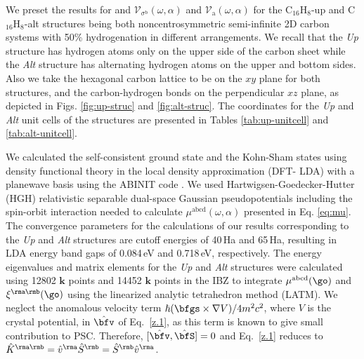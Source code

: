 \documentclass[prb,11pt,tightenlines,twocolumn,aps]{revtex4-1}
\begin{document}
We preset the results for 
and
$\mathcal{V}_{\sigma^{\mathrm{b}}}(\omega,\alpha)$ 
and
$\mathcal{V}_{\mathrm{a}}(\omega,\alpha)$ 
for the
C$_{16}$H$_{8}$-up  and C$_{16}$H$_{8}$-alt 
structures being both
noncentrosymmetric semi-infinite 2D carbon systems with 50\% hydrogenation in
different arrangements. We recall that the \emph{Up} structure has hydrogen
atoms only on the upper side of the carbon sheet while the \emph{Alt} structure
has alternating hydrogen atoms on the upper and bottom sides. Also we take the
hexagonal carbon lattice to be on the $xy$ plane for both structures, and the
carbon-hydrogen bonds on the perpendicular $xz$ plane, as depicted in Figs.
\ref{fig:up-struc} and \ref{fig:alt-struc}. The coordinates for the
\emph{Up} and \emph{Alt} unit cells of the structures are presented in Tables
\ref{tab:up-unitcell} and \ref{tab:alt-unitcell}. 

We calculated the self-consistent ground state and the Kohn-Sham
states using density functional theory in the local density approximation (DFT-
LDA) with a planewave basis using the ABINIT code \cite{gonzeCPC09}.
% 
We used Hartwigsen-Goedecker-Hutter (HGH) relativistic separable dual-space
Gaussian pseudopotentials \cite{hartwigsenPRB98} including the spin-orbit
interaction needed to calculate $\mu^{\mathrm{abcd}}(\omega,\alpha)$ presented
in Eq. \eqref{eq:mu}.
% 
The convergence parameters for the calculations of our results corresponding to
the \emph{Up} and \emph{Alt} structures are cutoff energies of 40\,Ha and
65\,Ha, resulting in LDA energy band gaps of 0.084\,eV and 0.718\,eV,
respectively. The energy eigenvalues and matrix elements for the \emph{Up} and
\emph{Alt} structures were calculated using 12802 $\mathbf{k}$ points and 14452
$\mathbf{k}$ points in the IBZ to integrate $\mu^{\mathrm{abcd}}(\go)$ and
$\xi^{\rma\rmb}(\go)$ using the linearized analytic tetrahedron method
(LATM).\cite{nastosPRB07} We neglect the anomalous velocity term
$\hbar(\bfgs\times\nabla V)/4m^2c^2$, where $V$ is the crystal potential, in
$\hat\bfv$ of Eq.~\eqref{z.1}, as this term is known to give small contribution
to PSC.\cite{bhatPRL05} Therefore, $[\hat\bfv,\hat\bfS]=0$ and Eq.~\eqref{z.1}
reduces to $\hat K^{\rma\rmb}=\hat v^\rma \hat S^\rmb=\hat S^\rmb \hat v^\rma$.


% 
\end{document}
